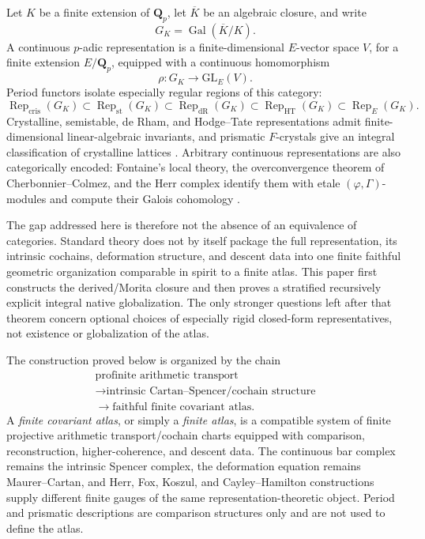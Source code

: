 \documentclass[11pt]{article}
\theoremstyle{definition}
\newcommand{\Qp}{\mathbf Q_p}
\newcommand{\GK}{G_K}
\newcommand{\Rep}{\operatorname{Rep}}
\newcommand{\Gal}{\operatorname{Gal}}
\newcommand{\cris}{\mathrm{cris}}
\newcommand{\st}{\mathrm{st}}
\newcommand{\dR}{\mathrm{dR}}
\begin{document}
Let $K$ be a finite extension of $\Qp$, let $\overline K$ be an algebraic closure, and write
\[
\GK=\Gal(\overline K/K).
\]
A continuous $p$-adic representation is a finite-dimensional $E$-vector space $V$, for a finite extension $E/\Qp$, equipped with a continuous homomorphism
\[
\rho:\GK\longrightarrow \mathrm{GL}_E(V).
\]
Period functors isolate especially regular regions of this category:
\[
\Rep_{\cris}(\GK)\subset \Rep_{\st}(\GK)\subset \Rep_{\dR}(\GK)
\subset \Rep_{\mathrm{HT}}(\GK)\subset \Rep_E(\GK).
\]
Crystalline, semistable, de Rham, and Hodge--Tate representations admit finite-dimensional linear-algebraic invariants, and prismatic $F$-crystals give an integral classification of crystalline lattices \cite{BhattScholzePFC}.  Arbitrary continuous representations are also categorically encoded: Fontaine's local theory, the overconvergence theorem of Cherbonnier--Colmez, and the Herr complex identify them with etale $(\varphi,\Gamma)$-modules and compute their Galois cohomology \cite{FontaineLocal,CherbonnierColmez,HerrSurvey,LiuCohomology,BergerTrianguline,ColmezTrianguline}.

The gap addressed here is therefore not the absence of an equivalence of categories.  Standard theory does not by itself package the full representation, its intrinsic cochains, deformation structure, and descent data into one finite faithful geometric organization comparable in spirit to a finite atlas.  This paper first constructs the derived/Morita closure and then proves a stratified recursively explicit integral native globalization.  The only stronger questions left after that theorem concern optional choices of especially rigid closed-form representatives, not existence or globalization of the atlas.

The construction proved below is organized by the chain
\[
\boxed{
\begin{gathered}
\text{profinite arithmetic transport}\\
\longrightarrow \text{intrinsic Cartan--Spencer/cochain structure}\\
\longrightarrow \text{faithful finite covariant atlas}.
\end{gathered}}
\]
A \emph{finite covariant atlas}, or simply a \emph{finite atlas}, is a compatible system of finite projective arithmetic transport/cochain charts equipped with comparison, reconstruction, higher-coherence, and descent data.  The continuous bar complex remains the intrinsic Spencer complex, the deformation equation remains Maurer--Cartan, and Herr, Fox, Koszul, and Cayley--Hamilton constructions supply different finite gauges of the same representation-theoretic object.  Period and prismatic descriptions are comparison structures only and are not used to define the atlas.
\end{document}
